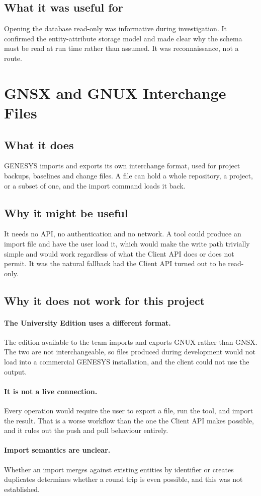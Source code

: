 \subsection{What it was useful for}

Opening the database read-only was informative during investigation. It confirmed
the entity-attribute storage model and made clear why the schema must be read at
run time rather than assumed. It was reconnaissance, not a route.

\section{GNSX and GNUX Interchange Files}

\subsection{What it does}

GENESYS imports and exports its own interchange format, used for project
backups, baselines and change files. A file can hold a whole repository, a
project, or a subset of one, and the import command loads it back.

\subsection{Why it might be useful}

It needs no API, no authentication and no network. A tool could produce an import
file and have the user load it, which would make the write path trivially simple
and would work regardless of what the Client API does or does not permit. It was
the natural fallback had the Client API turned out to be read-only.

\subsection{Why it does not work for this project}

\paragraph{The University Edition uses a different format.}
The edition available to the team imports and exports GNUX rather than GNSX. The
two are not interchangeable, so files produced during development would not load
into a commercial GENESYS installation, and the client could not use the output.

\paragraph{It is not a live connection.}
Every operation would require the user to export a file, run the tool, and import
the result. That is a worse workflow than the one the Client API makes possible,
and it rules out the push and pull behaviour entirely.

\paragraph{Import semantics are unclear.}
Whether an import merges against existing entities by identifier or creates
duplicates determines whether a round trip is even possible, and this was not
established.
